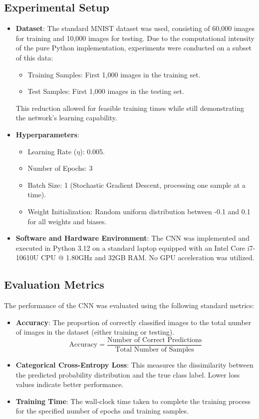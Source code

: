 \documentclass[conference]{IEEEtran}
\begin{document}
\subsection{Experimental Setup}
\begin{itemize}
    \item \textbf{Dataset}: The standard MNIST dataset was used, consisting of 60,000 images for training and 10,000 images for testing. Due to the computational intensity of the pure Python implementation, experiments were conducted on a subset of this data:
        \begin{itemize}
            \item Training Samples: First 1,000 images in the training set.
            \item Test Samples: First 1,000 images in the testing set.
        \end{itemize}
        This reduction allowed for feasible training times while still demonstrating the network's learning capability.
    \item \textbf{Hyperparameters}:
        \begin{itemize}
            \item Learning Rate ($\eta$): 0.005.
            \item Number of Epochs: 3
            \item Batch Size: 1 (Stochastic Gradient Descent, processing one sample at a time).
            \item Weight Initialization: Random uniform distribution between -0.1 and 0.1 for all weights and biases.
        \end{itemize}
    \item \textbf{Software and Hardware Environment}: The CNN was implemented and executed in Python 3.12 on a standard laptop equipped with an Intel Core i7-10610U CPU @ 1.80GHz and 32GB RAM. No GPU acceleration was utilized.
\end{itemize}

\subsection{Evaluation Metrics}
The performance of the CNN was evaluated using the following standard metrics:
\begin{itemize}
    \item \textbf{Accuracy}: The proportion of correctly classified images to the total number of images in the dataset (either training or testing).
        $$ \text{Accuracy} = \frac{\text{Number of Correct Predictions}}{\text{Total Number of Samples}} $$
    \item \textbf{Categorical Cross-Entropy Loss}: This measures the dissimilarity between the predicted probability distribution and the true class label. Lower loss values indicate better performance.
    \item \textbf{Training Time}: The wall-clock time taken to complete the training process for the specified number of epochs and training samples.
\end{itemize}
\end{document}

